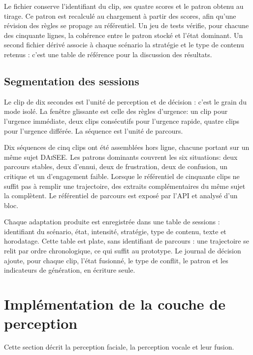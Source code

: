 Le fichier conserve l'identifiant du clip, ses quatre scores et le
patron obtenu au tirage. Ce patron est recalculé au chargement à
partir des scores, afin qu'une révision des règles se propage au
référentiel. Un jeu de tests vérifie, pour chacune des cinquante
lignes, la cohérence entre le patron stocké et l'état dominant. Un
second fichier dérivé associe à chaque scénario la stratégie et le
type de contenu retenus : c'est une table de référence pour la
discussion des résultats.

\subsection{Segmentation des sessions}
\label{subsec:impl-segmentation}



Le clip de dix secondes est l'unité de perception et de décision :
c'est le grain du mode isolé. La fenêtre glissante est celle des
règles d'urgence: un clip pour
l'urgence immédiate, deux clips consécutifs pour l'urgence rapide,
quatre clips pour l'urgence différée. La séquence est l'unité de
parcours.

Dix séquences de cinq clips ont été assemblées hors ligne, chacune
portant sur un même sujet \textsc{DAiSEE}. Les patrons dominants
couvrent les six situations: deux
parcours stables, deux d'ennui, deux de frustration, deux de
confusion, un critique et un d'engagement faible. Lorsque le
référentiel de cinquante clips ne suffit pas à remplir une
trajectoire, des extraits complémentaires du même sujet la
complètent. Le référentiel de parcours est exposé par l'API et
analysé d'un bloc.

Chaque adaptation produite est enregistrée dans une table de
sessions : identifiant du scénario, état, intensité, stratégie, type
de contenu, texte et horodatage. Cette table est plate, sans
identifiant de parcours : une trajectoire se relit par ordre
chronologique, ce qui suffit au prototype. Le journal de décision
ajoute, pour chaque clip, l'état fusionné, le type de conflit, le
patron et les indicateurs de génération, en écriture seule.

\section{Implémentation de la couche de perception}
\label{sec:impl-perception}

Cette section décrit la perception faciale, la perception vocale
et leur fusion.

